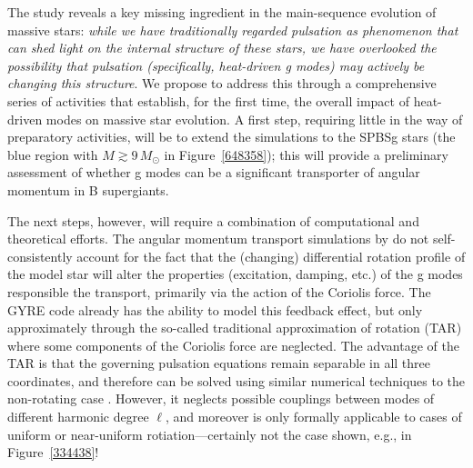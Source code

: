 The \citet{Townsend:2017} study reveals a key missing ingredient in the main-sequence evolution of massive stars: \emph{while we have traditionally regarded pulsation as phenomenon that can shed light on the internal structure of these stars, we have overlooked the possibility that pulsation (specifically, heat-driven g modes) may actively be changing this structure}. We propose to address this through a comprehensive series of activities that establish, for the first time, the overall impact of heat-driven modes on massive star evolution. A first step, requiring little in the way of preparatory activities, will be to extend the \citet{Townsend:2017} simulations to the SPBSg stars (the blue region with $M \gtrsim 9\,M_{\odot}$ in Figure~\ref{648358}); this will provide a preliminary assessment of whether g modes can be a significant transporter of angular momentum in B supergiants.

The next steps, however, will require a combination of computational and theoretical efforts.
The angular momentum transport simulations by \citet{Townsend:2017} do not self-consistently account for the fact that the (changing) differential rotation profile of the model star will alter the properties (excitation, damping, etc.) of the g modes responsible the transport, primarily via the action of the Coriolis force. The GYRE code already has the ability to model this feedback effect, but only approximately through the so-called traditional approximation of rotation (TAR) where some components of the Coriolis force are neglected. The advantage of the TAR is that the governing pulsation equations remain separable in all three coordinates, and therefore can be solved using similar numerical techniques to the non-rotating case \citep[see, e.g.,][for a demonstration of the TAR applied to rotating SPB stars]{Townsend:2005}. However, it neglects possible couplings between modes of different harmonic degree $\ell$, and moreover is only formally applicable to cases of uniform or near-uniform rotiation---certainly not the case shown, e.g., in Figure~\ref{334438}!


